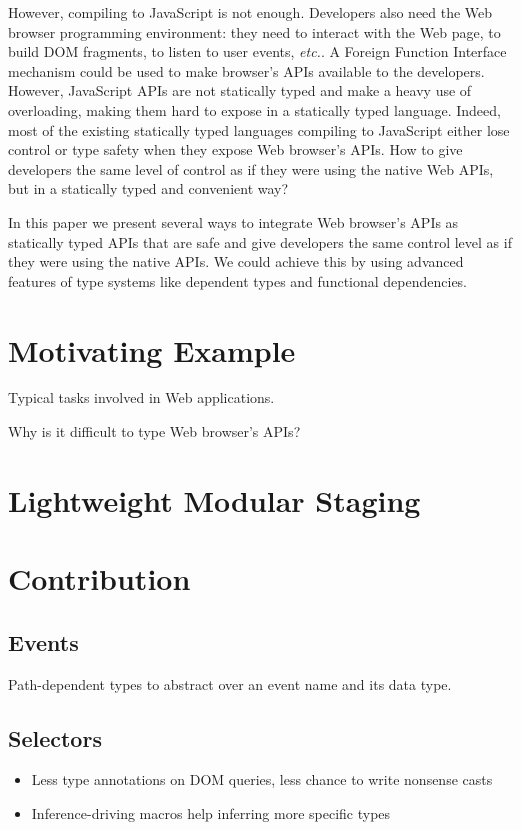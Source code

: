 \documentclass[runningheads,a4paper]{llncs}
\newcommand{\etc}{\emph{etc.}}
\begin{document}
However, compiling to JavaScript is not enough. Developers also need the Web browser programming environment: they
need to interact with the Web page, to build DOM fragments, to listen to user events, \etc. A Foreign Function
Interface mechanism could be used to make browser’s APIs available to the developers. However, JavaScript APIs are
not statically typed and make a heavy use of overloading, making them hard to expose in a statically typed language.
Indeed, most of the existing statically typed languages compiling to JavaScript either lose control or type safety
when they expose Web browser’s APIs. How to give developers the same level of control as if they were using the
native Web APIs, but in a statically typed and convenient way?

In this paper we present several ways to integrate Web browser’s APIs as statically typed APIs that are safe and
give developers the same control level as if they were using the native APIs. We could achieve this
by using advanced features of type systems like dependent types and functional dependencies.

\section{Motivating Example}

Typical tasks involved in Web applications.

Why is it difficult to type Web browser’s APIs?

\section{Lightweight Modular Staging}

\section{Contribution}

\subsection{Events}

Path-dependent types to abstract over an event name and its data type.

\subsection{Selectors}

\begin{itemize}
 \item Less type annotations on DOM queries, less chance to write nonsense casts
 \item Inference-driving macros help inferring more specific types
\end{itemize}
\end{document}
